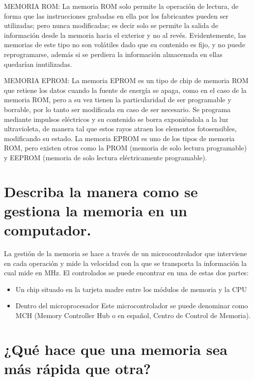 \documentclass{article}
\begin{document}
MEMORIA ROM: La memoria ROM solo permite la operación de lectura, de forma que las instrucciones grabadas en ella por
los fabricantes pueden ser utilizadas; pero nunca modificadas; es decir solo se permite la salida de información desde
la memoria hacia el exterior y no al revés. Evidentemente, las memorias de este tipo no son volátiles dado que su
contenido es fijo, y no puede reprogramarse, además si se perdiera la información almacenada en ellas quedarían
inutilizadas.

MEMORIA EPROM: La memoria EPROM es un tipo de chip de memoria ROM que retiene los datos cuando la fuente de energía se
apaga, como en el caso de la memoria ROM, pero a su vez tienen la particularidad de ser programable y borrable, por
lo tanto ser modificada en caso de ser necesario. Se programa mediante impulsos eléctricos y su contenido se borra
exponiéndola a la luz ultravioleta, de manera tal que estos rayos atraen los elementos fotosensibles, modificando su
estado. La memoria EPROM es uno de los tipos de memoria ROM, pero existen otros como la PROM (memoria de
solo lectura programable) y EEPROM (memoria de solo lectura eléctricamente programable).\cite{SILO.TIPS}


\section{Describa la manera como se gestiona la memoria en un computador.}

La gestión de la memoria se hace a través de un microcontrolador que interviene en cada operación y mide la velocidad con la que se transporta la información la cual mide en MHz. El controlados se puede encontrar en una de estas dos partes:
\begin{itemize}
\item{ Un chip situado en la tarjeta madre entre los módulos de memoria y la CPU}
\end{itemize}

\begin{itemize}
\item{ Dentro del microprocesador Este microcontrolador se puede denominar como MCH (Memory Controller Hub o en español, Centro de Control de Memoria).}
\end{itemize}


\section{¿Qué hace que una memoria sea más rápida que otra?}
\end{document}
